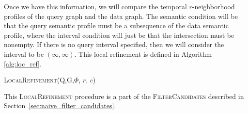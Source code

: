 Once we have this information, we will compare the temporal $r$-neighborhood
profiles of the query graph and the data graph. The semantic condition will be
that the query semantic profile must be a subsequence of the data semantic
profile, where the interval condition will just be that the intersection must be
nonempty.  If there is no query interval specified, then we will consider the
interval to be $(\infty, \infty)$. This local refinement is defined in Algorithm
\ref{alg:loc_ref}.

\begin{algorithm}
  \label{alg:loc_ref}
  \caption{\textsc{LocalRefinement(Q,G,$\Phi$, $r$, $c$)}}
  \SetAlgoLined

\end{algorithm}

This \textsc{LocalRefinement} procedure is a part of the
\textsc{FilterCandidates} described in
Section~\ref{sec:naive_filter_candidates}.


